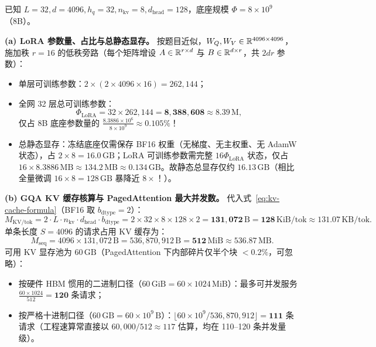 已知 $L = 32, d = 4096, h_q = 32, n_{\mathrm{kv}} = 8, d_{\mathrm{head}} = 128$，底座规模 $\Phi = 8 \times 10^9$（8B）。

\textbf{(a) LoRA 参数量、占比与总静态显存。} 按题目近似，$W_Q, W_V \in \mathbb{R}^{4096 \times 4096}$，施加秩 $r = 16$ 的低秩旁路（每个矩阵增设 $A \in \mathbb{R}^{r \times d}$ 与 $B \in \mathbb{R}^{d \times r}$，共 $2dr$ 参数）：
\begin{itemize}
  \item 单层可训练参数：$2 \times (2 \times 4096 \times 16) = 262{,}144$；
  \item 全网 32 层总可训练参数：
  \[
    \Phi_{\mathrm{LoRA}} = 32 \times 262{,}144 = \mathbf{8{,}388{,}608 \approx 8.39\,\mathrm{M}},
  \]
  仅占 8B 底座参数量的 $\frac{8.3886 \times 10^6}{8 \times 10^9} \approx \mathbf{0.105\%}$！
  \item 总静态显存：冻结底座仅需保存 BF16 权重（无梯度、无主权重、无 AdamW 状态），占 $2 \times 8 = 16.0\,\mathrm{GB}$；LoRA 可训练参数需完整 $16\Phi_{\mathrm{LoRA}}$ 状态，仅占 $16 \times 8.3886\,\mathrm{MB} \approx \mathbf{134.2\,\mathrm{MB} \approx 0.134\,\mathrm{GB}}$。故静态总显存仅约 $\mathbf{16.13\,\mathrm{GB}}$（相比全量微调 $16 \times 8 = 128\,\mathrm{GB}$ 暴降近 $8\times$！）。
\end{itemize}

\textbf{(b) GQA KV 缓存核算与 PagedAttention 最大并发数。} 代入式~\eqref{eq:kv-cache-formula}（BF16 取 $b_{\mathrm{dtype}} = 2$）：
\[
  M_{\mathrm{KV/tok}} = 2 \cdot L \cdot n_{\mathrm{kv}} \cdot d_{\mathrm{head}} \cdot b_{\mathrm{dtype}}
  = 2 \times 32 \times 8 \times 128 \times 2 = \mathbf{131{,}072\,\mathrm{B}} = \mathbf{128\,\mathrm{KiB/tok}} \approx 131.07\,\mathrm{KB/tok}.
\]
单条长度 $S = 4096$ 的请求占用 KV 缓存为：
\[
  M_{\mathrm{seq}} = 4096 \times 131{,}072\,\mathrm{B} = 536{,}870{,}912\,\mathrm{B} = \mathbf{512\,\mathrm{MiB}} \approx \mathbf{536.87\,\mathrm{MB}}.
\]
可用 KV 显存池为 $60\,\mathrm{GB}$（PagedAttention 下内部碎片仅半个块 $< 0.2\%$，可忽略）：
\begin{itemize}
  \item 按硬件 HBM 惯用的二进制口径（$60\,\mathrm{GiB} = 60 \times 1024\,\mathrm{MiB}$）：最多可并发服务 $\frac{60 \times 1024}{512} = \mathbf{120}$ 条请求；
  \item 按严格十进制口径（$60\,\mathrm{GB} = 60 \times 10^9\,\mathrm{B}$）：$\lfloor 60 \times 10^9 / 536{,}870{,}912 \rfloor = \mathbf{111}$ 条请求（工程速算常直接以 $60{,}000 / 512 \approx 117$ 估算，均在 110--120 条并发量级）。
\end{itemize}

